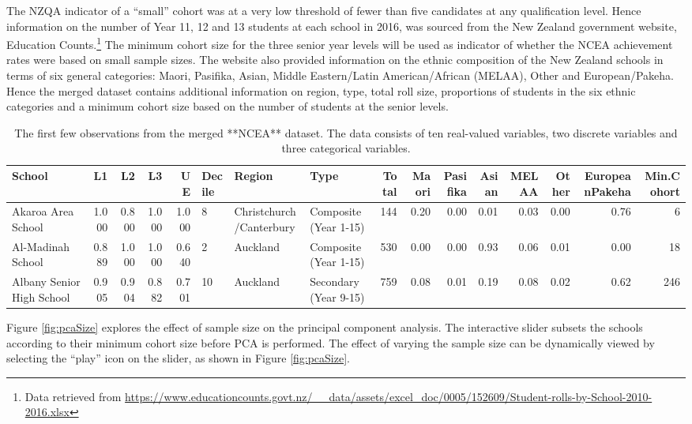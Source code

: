 \documentclass[]{book}
\let\rmarkdownfootnote\footnote%
\def\footnote{\protect\rmarkdownfootnote}
\theoremstyle{definition}
\theoremstyle{definition}
\theoremstyle{definition}
\theoremstyle{remark}
\begin{document}
The NZQA indicator of a ``small'' cohort was at a very low threshold of
fewer than five candidates at any qualification level. Hence information
on the number of Year 11, 12 and 13 students at each school in 2016, was
sourced from the New Zealand government website, Education
Counts.\footnote{Data retrieved from
  \url{https://www.educationcounts.govt.nz/__data/assets/excel_doc/0005/152609/Student-rolls-by-School-2010-2016.xlsx}}
The minimum cohort size for the three senior year levels will be used as
indicator of whether the NCEA achievement rates were based on small
sample sizes. The website also provided information on the ethnic
composition of the New Zealand schools in terms of six general
categories: Maori, Pasifika, Asian, Middle Eastern/Latin
American/African (MELAA), Other and European/Pakeha. Hence the merged
dataset contains additional information on region, type, total roll
size, proportions of students in the six ethnic categories and a minimum
cohort size based on the number of students at the senior levels.

\begin{table}

\caption{\label{tab:unnamed-chunk-14}The first few observations from the merged **NCEA** dataset. The data consists of ten real-valued variables, two discrete variables and three categorical variables.}
\centering
\begin{tabular}[t]{lrrrrlllrrrrrrrr}
\toprule
School & L1 & L2 & L3 & UE & Decile & Region & Type & Total & Maori & Pasifika & Asian & MELAA & Other & EuropeanPakeha & Min.Cohort\\
\midrule
Akaroa Area School & 1.000 & 0.800 & 1.000 & 1.000 & 8 & Christchurch/Canterbury & Composite (Year 1-15) & 144 & 0.20 & 0.00 & 0.01 & 0.03 & 0.00 & 0.76 & 6\\
Al-Madinah School & 0.889 & 1.000 & 1.000 & 0.640 & 2 & Auckland & Composite (Year 1-15) & 530 & 0.00 & 0.00 & 0.93 & 0.06 & 0.01 & 0.00 & 18\\
Albany Senior High School & 0.905 & 0.904 & 0.882 & 0.701 & 10 & Auckland & Secondary (Year 9-15) & 759 & 0.08 & 0.01 & 0.19 & 0.08 & 0.02 & 0.62 & 246\\
\bottomrule
\end{tabular}
\end{table}

Figure \ref{fig:pcaSize} explores the effect of sample size on the
principal component analysis. The interactive slider subsets the schools
according to their minimum cohort size before PCA is performed. The
effect of varying the sample size can be dynamically viewed by selecting
the ``play'' icon on the slider, as shown in Figure \ref{fig:pcaSize}.
\end{document}
